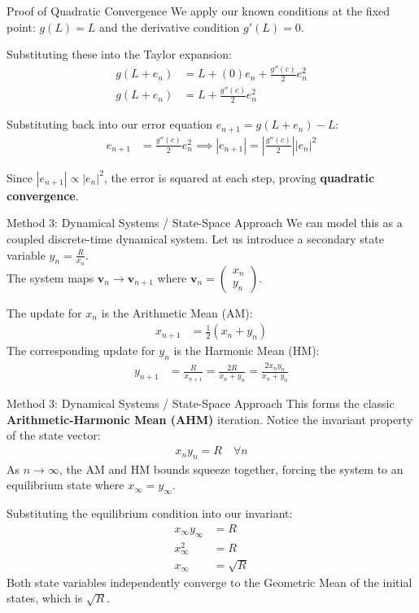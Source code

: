 \documentclass{beamer}
\theoremstyle{remark}
\providecommand{\abs}[1]{\left\vert#1\right\vert}
\newcommand{\myvec}[1]{\ensuremath{\begin{pmatrix}#1\end{pmatrix}}}
\let\vec\mathbf
\numberwithin{equation}{section}
\begin{document}
\begin{frame}{Proof of Quadratic Convergence}
    We apply our known conditions at the fixed point: $g(L) = L$ and the derivative condition $g'(L) = 0$.
    
    \vspace{0.3cm}
    Substituting these into the Taylor expansion:
    \begin{align}
        g(L + e_n) &= L + (0)e_n + \frac{g''(c)}{2}e_n^2 \\
        g(L + e_n) &= L + \frac{g''(c)}{2}e_n^2
    \end{align}
    
    Substituting back into our error equation $e_{n+1} = g(L + e_n) - L$:
    \begin{align}
        e_{n+1} &= \frac{g''(c)}{2}e_n^2 \implies \abs{e_{n+1}} = \abs{\frac{g''(c)}{2}} \abs{e_n}^2
    \end{align}
    
    Since $\abs{e_{n+1}} \propto \abs{e_n}^2$, the error is squared at each step, proving \textbf{quadratic convergence}.
\end{frame}
\iffalse
\begin{frame}{Method 3: Dynamical Systems / State-Space Approach}
    We can model this as a coupled discrete-time dynamical system. Let us introduce a secondary state variable $y_n = \frac{R}{x_n}$. \\
    The system maps $\vec{v}_n \to \vec{v}_{n+1}$ where $\vec{v}_n = \myvec{x_n \\ y_n}$.
    
    The update for $x_n$ is the Arithmetic Mean (AM):
    \begin{align}
        x_{n+1} &= \frac{1}{2}(x_n + y_n)
    \end{align}
    The corresponding update for $y_n$ is the Harmonic Mean (HM):
    \begin{align}
        y_{n+1} &= \frac{R}{x_{n+1}} = \frac{2R}{x_n + y_n} = \frac{2 x_n y_n}{x_n + y_n}
    \end{align}
\end{frame}

\begin{frame}{Method 3: Dynamical Systems / State-Space Approach}
    This forms the classic \textbf{Arithmetic-Harmonic Mean (AHM)} iteration. 
    Notice the invariant property of the state vector:
    \begin{align}
        x_n y_n = R \quad \forall n
    \end{align}
    As $n \to \infty$, the AM and HM bounds squeeze together, forcing the system to an equilibrium state where $x_\infty = y_\infty$.
    
    Substituting the equilibrium condition into our invariant:
    \begin{align}
        x_\infty y_\infty &= R \\
        x_\infty^2 &= R \\
        x_\infty &= \sqrt{R}
    \end{align}
    Both state variables independently converge to the Geometric Mean of the initial states, which is $\sqrt{R}$.
\end{frame}
\end{document}
